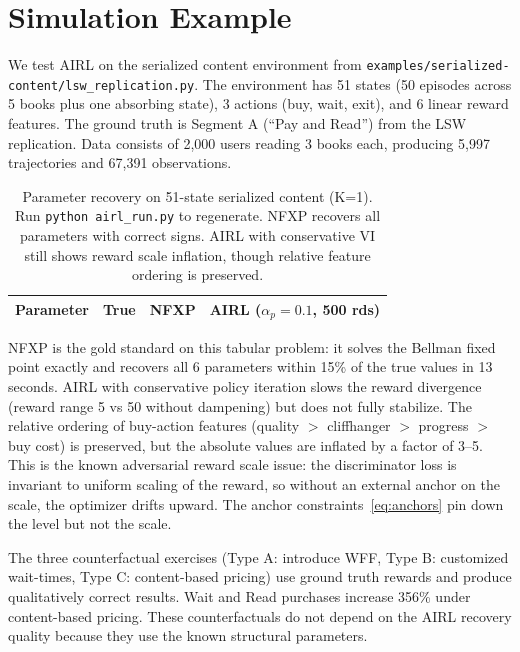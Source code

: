 \documentclass[11pt]{article}
\begin{document}
\section{Simulation Example}

We test AIRL on the serialized content environment from \texttt{examples/serialized-content/lsw\_replication.py}. The environment has 51 states (50 episodes across 5 books plus one absorbing state), 3 actions (buy, wait, exit), and 6 linear reward features. The ground truth is Segment A (``Pay and Read'') from the LSW replication. Data consists of 2,000 users reading 3 books each, producing 5,997 trajectories and 67,391 observations.

\begin{table}[h!]
\centering\small
\begin{tabular}{lrrr}
\toprule
Parameter & True & NFXP & AIRL ($\alpha_p\!=\!0.1$, 500 rds) \\
\midrule
\bottomrule
\end{tabular}
\caption{Parameter recovery on 51-state serialized content (K=1). Run \texttt{python airl\_run.py} to regenerate. NFXP recovers all parameters with correct signs. AIRL with conservative VI still shows reward scale inflation, though relative feature ordering is preserved.}
\label{tab:results}
\end{table}
\FloatBarrier

NFXP is the gold standard on this tabular problem: it solves the Bellman fixed point exactly and recovers all 6 parameters within 15\% of the true values in 13 seconds. AIRL with conservative policy iteration slows the reward divergence (reward range 5 vs 50 without dampening) but does not fully stabilize. The relative ordering of buy-action features (quality $>$ cliffhanger $>$ progress $>$ buy cost) is preserved, but the absolute values are inflated by a factor of 3--5. This is the known adversarial reward scale issue: the discriminator loss is invariant to uniform scaling of the reward, so without an external anchor on the scale, the optimizer drifts upward. The anchor constraints~\eqref{eq:anchors} pin down the level but not the scale.

The three counterfactual exercises (Type A: introduce WFF, Type B: customized wait-times, Type C: content-based pricing) use ground truth rewards and produce qualitatively correct results. Wait and Read purchases increase 356\% under content-based pricing. These counterfactuals do not depend on the AIRL recovery quality because they use the known structural parameters.
\end{document}
